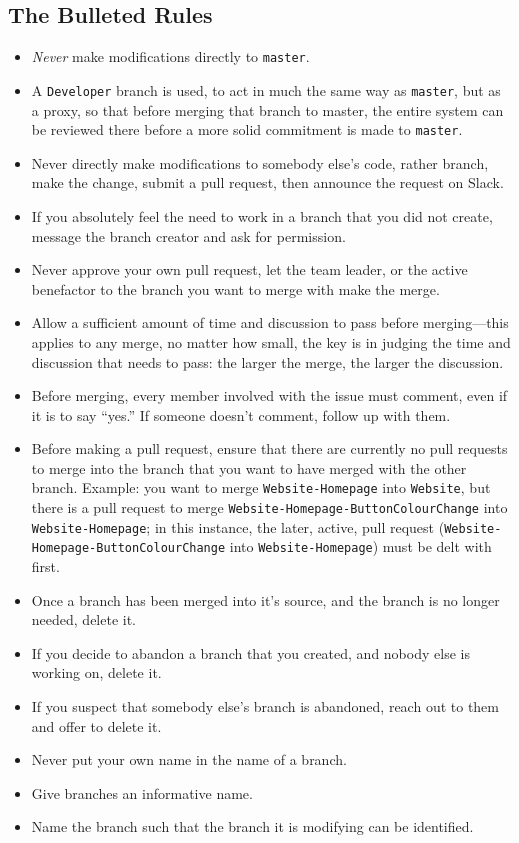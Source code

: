 \documentclass[12pt]{article}
\begin{document}
  \subsection{The Bulleted Rules}
  \begin{itemize}
   \item \textit{Never} make modifications directly to \texttt{master}.
   \item A \texttt{Developer} branch is used, to act in much the same way as \texttt{master}, but as a proxy, so that before merging that branch to master, the entire system can be reviewed there before a more solid commitment is made to \texttt{master}.
   \item Never directly make modifications to somebody else's code, rather branch, make the change, submit a pull request, then announce the request on Slack.
   \item If you absolutely feel the need to work in a branch that you did not create, message the branch creator and ask for permission.
   \item Never approve your own pull request, let the team leader, or the active benefactor to the branch you want to merge with make the merge.
   \item Allow a sufficient amount of time and discussion to pass before merging---this applies to any merge, no matter how small, the key is in judging the time and discussion that needs to pass: the larger the merge, the larger the discussion.
   \item Before merging, every member involved with the issue must comment, even if it is to say ``yes.'' If someone doesn't comment, follow up with them.
   \item Before making a pull request, ensure that there are currently no pull requests to merge into the branch that you want to have merged with the other branch. Example: you want to merge \texttt{Website-Homepage} into \texttt{Website}, but there is a pull request to merge \texttt{Website-Homepage-ButtonColourChange} into \texttt{Website-Homepage}; in this instance, the later, active, pull request (\texttt{Website-Homepage-ButtonColourChange} into \texttt{Website-Homepage}) must be delt with first.
   \item Once a branch has been merged into it's source, and the branch is no longer needed, delete it.
   \item If you decide to abandon a branch that you created, and nobody else is working on, delete it.
   \item If you suspect that somebody else's branch is abandoned, reach out to them and offer to delete it.
   \item Never put your own name in the name of a branch.
   \item Give branches an informative name.
   \item Name the branch such that the branch it is modifying can be identified.
   
  \end{itemize}


  
\end{document}
